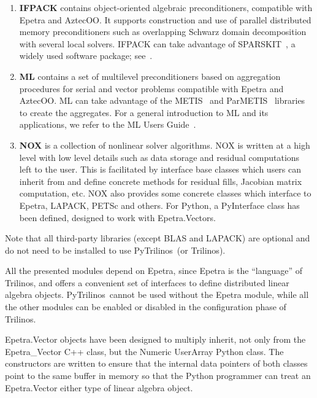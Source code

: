 \documentclass[acmtocl]{acmtrans2m}
\newcommand{\PyTrilinos}{{PyTrilinos}}
\begin{document}
\begin{enumerate}
\item {\bf IFPACK} contains object-oriented algebraic preconditioners,
  compatible with Epetra and AztecOO.  It supports construction and
  use of parallel distributed memory preconditioners such as
  overlapping Schwarz domain decomposition with several local solvers.
  IFPACK can take advantage of SPARSKIT~\cite{sparskit}, a widely used
  software package; see~\cite{ifpack-guide}.

\item {\bf ML} contains a set of multilevel preconditioners based on
  aggregation procedures for serial and vector problems compatible
  with Epetra and AztecOO. ML can take advantage of the
  METIS~\cite{metis} and ParMETIS~\cite{parmetis} libraries to create
  the aggregates.  For a general introduction to ML and its
  applications, we refer to the ML Users Guide~\cite{ml-guide}.

\item {\bf NOX} is a collection of nonlinear solver algorithms.  NOX
  is written at a high level with low level details such as data
  storage and residual computations left to the user.  This is
  facilitated by interface base classes which users can inherit from
  and define concrete methods for residual fills, Jacobian matrix
  computation, etc.  NOX also provides some concrete classes which
  interface to Epetra, LAPACK, PETSc and others.  For Python, a
  PyInterface class has been defined, designed to work with
  Epetra.Vectors.

\end{enumerate}

Note that all third-party libraries (except BLAS and LAPACK) are
optional and do not need to be installed to use \PyTrilinos\ (or
Trilinos).

All the presented modules depend on Epetra, since Epetra is the
``language'' of Trilinos, and offers a convenient set of interfaces to
define distributed linear algebra objects.  \PyTrilinos\ cannot be
used without the Epetra module, while all the other modules can be
enabled or disabled in the configuration phase of Trilinos.

Epetra.Vector objects have been designed to multiply inherit, not only
from the Epetra\_Vector C++ class, but the Numeric UserArray Python
class.  The constructors are written to ensure that the internal data
pointers of both classes point to the same buffer in memory so that
the Python programmer can treat an Epetra.Vector either type of linear
algebra object.
\end{document}
